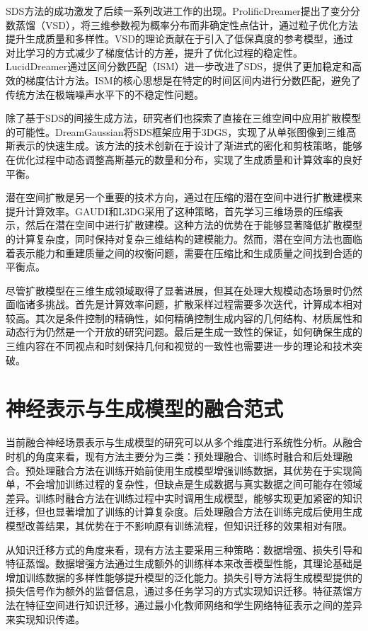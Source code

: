 SDS方法的成功激发了后续一系列改进工作的出现。ProlificDreamer提出了变分分数蒸馏（VSD），将三维参数视为概率分布而非确定性点估计，通过粒子优化方法提升生成质量和多样性\cite{prolificdreamer2023}。VSD的理论贡献在于引入了低保真度的参考模型，通过对比学习的方式减少了梯度估计的方差，提升了优化过程的稳定性。LucidDreamer通过区间分数匹配（ISM）进一步改进了SDS，提供了更加稳定和高效的梯度估计方法\cite{luciddreamer2023}。ISM的核心思想是在特定的时间区间内进行分数匹配，避免了传统方法在极端噪声水平下的不稳定性问题。

除了基于SDS的间接生成方法，研究者们也探索了直接在三维空间中应用扩散模型的可能性。DreamGaussian将SDS框架应用于3DGS，实现了从单张图像到三维高斯表示的快速生成\cite{dreamgaussian2023}。该方法的技术创新在于设计了渐进式的密化和剪枝策略，能够在优化过程中动态调整高斯基元的数量和分布，实现了生成质量和计算效率的良好平衡。

潜在空间扩散是另一个重要的技术方向，通过在压缩的潜在空间中进行扩散建模来提升计算效率。GAUDI和L3DG采用了这种策略，首先学习三维场景的压缩表示，然后在潜在空间中进行扩散建模\cite{gaudi2022,rossle2024l3dg}。这种方法的优势在于能够显著降低扩散模型的计算复杂度，同时保持对复杂三维结构的建模能力。然而，潜在空间方法也面临着表示能力和重建质量之间的权衡问题，需要在压缩比和生成质量之间找到合适的平衡点。

尽管扩散模型在三维生成领域取得了显著进展，但其在处理大规模动态场景时仍然面临诸多挑战。首先是计算效率问题，扩散采样过程需要多次迭代，计算成本相对较高。其次是条件控制的精确性，如何精确控制生成内容的几何结构、材质属性和动态行为仍然是一个开放的研究问题。最后是生成一致性的保证，如何确保生成的三维内容在不同视点和时刻保持几何和视觉的一致性也需要进一步的理论和技术突破。

\section{神经表示与生成模型的融合范式}

当前融合神经场景表示与生成模型的研究可以从多个维度进行系统性分析。从融合时机的角度来看，现有方法主要分为三类：预处理融合、训练时融合和后处理融合。预处理融合方法在训练开始前使用生成模型增强训练数据，其优势在于实现简单，不会增加训练过程的复杂性，但缺点是生成数据与真实数据之间可能存在领域差异。训练时融合方法在训练过程中实时调用生成模型，能够实现更加紧密的知识迁移，但也显著增加了训练的计算复杂度。后处理融合方法在训练完成后使用生成模型改善结果，其优势在于不影响原有训练流程，但知识迁移的效果相对有限。

从知识迁移方式的角度来看，现有方法主要采用三种策略：数据增强、损失引导和特征蒸馏。数据增强方法通过生成额外的训练样本来改善模型性能，其理论基础是增加训练数据的多样性能够提升模型的泛化能力。损失引导方法将生成模型提供的损失信号作为额外的监督信息，通过多任务学习的方式实现知识迁移。特征蒸馏方法在特征空间进行知识迁移，通过最小化教师网络和学生网络特征表示之间的差异来实现知识传递。

